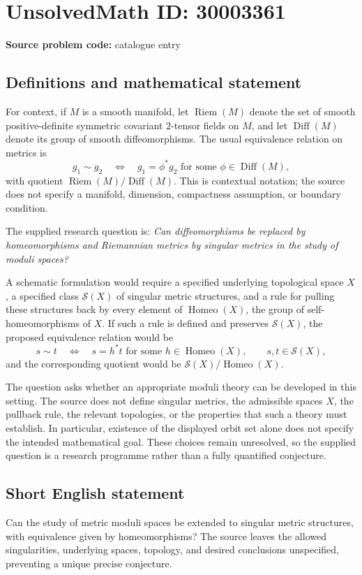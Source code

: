 \documentclass[11pt]{article}
\begin{document}
\section*{UnsolvedMath ID: 30003361}
\textbf{Source problem code:} catalogue entry
\subsection{Definitions and mathematical statement}
For context, if \(M\) is a smooth manifold, let \(\operatorname{Riem}(M)\) denote the set of smooth positive-definite symmetric covariant \(2\)-tensor fields on \(M\), and let \(\operatorname{Diff}(M)\) denote its group of smooth diffeomorphisms. The usual equivalence relation on metrics is
\[
 g_1\sim g_2\quad\Longleftrightarrow\quad g_1=\phi^*g_2\text{ for some }\phi\in\operatorname{Diff}(M),
\]
with quotient \(\operatorname{Riem}(M)/\operatorname{Diff}(M)\). This is contextual notation; the source does not specify a manifold, dimension, compactness assumption, or boundary condition.

The supplied research question is: \emph{Can diffeomorphisms be replaced by homeomorphisms and Riemannian metrics by singular metrics in the study of moduli spaces?}

A schematic formulation would require a specified underlying topological space \(X\), a specified class \(\mathcal S(X)\) of singular metric structures, and a rule for pulling these structures back by every element of \(\operatorname{Homeo}(X)\), the group of self-homeomorphisms of \(X\). If such a rule is defined and preserves \(\mathcal S(X)\), the proposed equivalence relation would be
\[
 s\sim t\quad\Longleftrightarrow\quad s=h^*t\text{ for some }h\in\operatorname{Homeo}(X),
 \qquad s,t\in\mathcal S(X),
\]
and the corresponding quotient would be \(\mathcal S(X)/\operatorname{Homeo}(X)\).

The question asks whether an appropriate moduli theory can be developed in this setting. The source does not define singular metrics, the admissible spaces \(X\), the pullback rule, the relevant topologies, or the properties that such a theory must establish. In particular, existence of the displayed orbit set alone does not specify the intended mathematical goal. These choices remain unresolved, so the supplied question is a research programme rather than a fully quantified conjecture.
\subsection{Short English statement}
Can the study of metric moduli spaces be extended to singular metric structures, with equivalence given by homeomorphisms? The source leaves the allowed singularities, underlying spaces, topology, and desired conclusions unspecified, preventing a unique precise conjecture.
\end{document}
